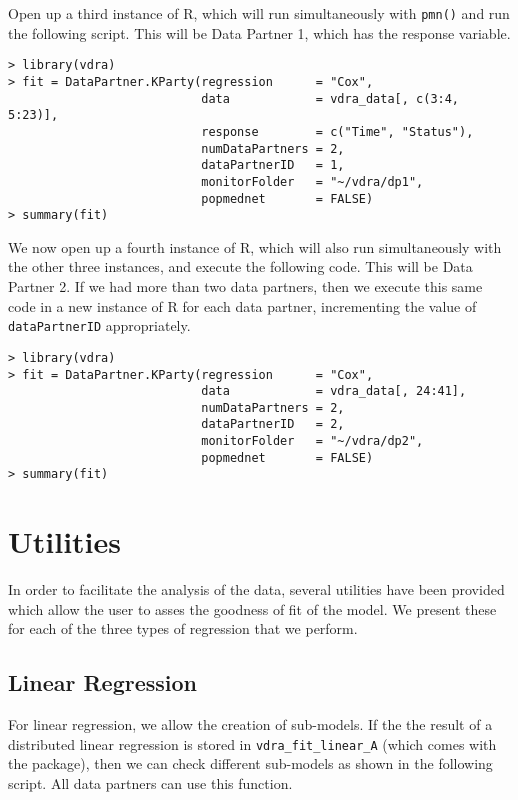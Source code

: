 \documentclass[12]{article}
\begin{document}
Open up a third instance of R, which will run simultaneously with \verb"pmn()" and run the following script.  This will be Data Partner 1, which has the response variable.


\begin{verbatim}
> library(vdra)
> fit = DataPartner.KParty(regression      = "Cox",
                           data            = vdra_data[, c(3:4, 5:23)],
                           response        = c("Time", "Status"),
                           numDataPartners = 2,
                           dataPartnerID   = 1,
                           monitorFolder   = "~/vdra/dp1",
                           popmednet       = FALSE)
> summary(fit)
\end{verbatim}

We now open up a fourth instance of R, which will also run simultaneously with the other three instances, and execute the following code.  This will be Data Partner 2.  If we had more than two data partners, then we execute this same code in a new instance of R for each data partner, incrementing the value of \verb"dataPartnerID" appropriately.

\begin{verbatim}
> library(vdra)
> fit = DataPartner.KParty(regression      = "Cox",
                           data            = vdra_data[, 24:41],
                           numDataPartners = 2,
                           dataPartnerID   = 2,
                           monitorFolder   = "~/vdra/dp2",
                           popmednet       = FALSE)
> summary(fit)
\end{verbatim}

\section{Utilities}

In order to facilitate the analysis of the data, several utilities have been provided which allow the user to asses the goodness of fit of the model.  We present these for each of the three types of regression that we perform.

\subsection{Linear Regression}

For linear regression, we allow the creation of sub-models.  If the the result of a distributed linear regression is stored in \verb"vdra_fit_linear_A" (which comes with the package), then we can check different sub-models as shown in the following script.  All data partners can use this function.
\end{document}
